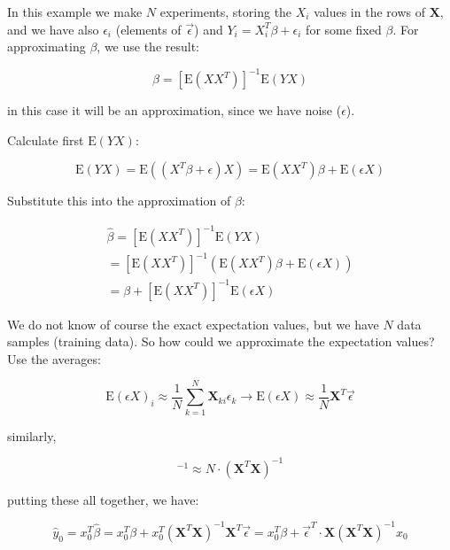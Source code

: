 \documentclass{article}
\begin{document}
In this example we make $N$ experiments, storing the $X_i$ values in the rows of $\textbf{X}$, and we have also $\epsilon_i$ (elements of $\vec{\epsilon}$) and $Y_i = X_i^T\beta + \epsilon_i$ for some fixed $\beta$. For approximating $\beta$, we use the result:

\begin{equation}
    \beta = [\text{E} (XX^T)]^{-1} \text{E} (YX)
\end{equation}

in this case it will be an approximation, since we have noise ($\epsilon$).

Calculate first $\text{E} (YX)$:

\begin{equation}
    \text{E} (YX) = \text{E} ((X^T\beta + \epsilon)X) = \text{E} (XX^T)\beta + \text{E} (\epsilon X)
\end{equation}

Substitute this into the approximation of $\beta$:

\begin{equation}
    \begin{split}
        \hat{\beta} = [\text{E} (XX^T)]^{-1} \text{E} (YX)\\
        = [\text{E} (XX^T)]^{-1} (\text{E} (XX^T)\beta + \text{E} (\epsilon X))\\
        = \beta + [\text{E} (XX^T)]^{-1} \text{E} (\epsilon X)
    \end{split}
\end{equation}

We do not know of course the exact expectation values, but we have $N$ data samples (training data). So how could we approximate the expectation values? Use the averages:

\begin{equation}
    \text{E}(\epsilon X)_i \approx \frac{1}{N} \sum_{k=1}^N \textbf{X}_{ki} \epsilon_k \to \text{E} (\epsilon X) \approx \frac{1}{N} \textbf{X}^T \vec{\epsilon}
\end{equation}

similarly,

\begin{equation}
    [\text{E} (XX^T)]^{-1} \approx N \cdot (\textbf{X}^T \textbf{X})^{-1}
\end{equation}

putting these all together, we have:

\begin{equation}
    \hat{y}_0 = x_0^T \hat{\beta} = x_0^T \beta + x_0^T (\textbf{X}^T\textbf{X})^{-1} \textbf{X}^T \vec{\epsilon} = x_0^T \beta + \vec{\epsilon}^T \cdot \textbf{X} (\textbf{X}^T \textbf{X})^{-1} x_0
\end{equation}
\end{document}
